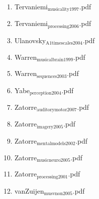 \documentclass[11pt]{article}
\begin{document}
\begin{enumerate}
\begin{enumerate}
\item Tervaniemi$_{\text{musicality1997}}$.pdf
\label{sec-1-1-1-1-30-29-39}

\item Tervaniemi$_{\text{processing2006}}$.pdf
\label{sec-1-1-1-1-30-29-40}

\item Ulanovsky$_{\text{A1timescales2004}}$.pdf
\label{sec-1-1-1-1-30-29-41}

\item Warren$_{\text{musicalbrain1999}}$.pdf
\label{sec-1-1-1-1-30-29-42}

\item Warren$_{\text{sequences2003}}$.pdf
\label{sec-1-1-1-1-30-29-43}

\item Yabe$_{\text{perception2004}}$.pdf
\label{sec-1-1-1-1-30-29-44}

\item Zatorre$_{\text{auditorymotor2007}}$.pdf
\label{sec-1-1-1-1-30-29-45}

\item Zatorre$_{\text{imagery2005}}$.pdf
\label{sec-1-1-1-1-30-29-46}

\item Zatorre$_{\text{mentalmodels2002}}$.pdf
\label{sec-1-1-1-1-30-29-47}

\item Zatorre$_{\text{musicneuro2005}}$.pdf
\label{sec-1-1-1-1-30-29-48}

\item Zatorre$_{\text{processing2001}}$.pdf
\label{sec-1-1-1-1-30-29-49}

\item vanZuijen$_{\text{musvnon2005}}$.pdf
\label{sec-1-1-1-1-30-29-50}
\end{enumerate}
\end{enumerate}
\end{document}
